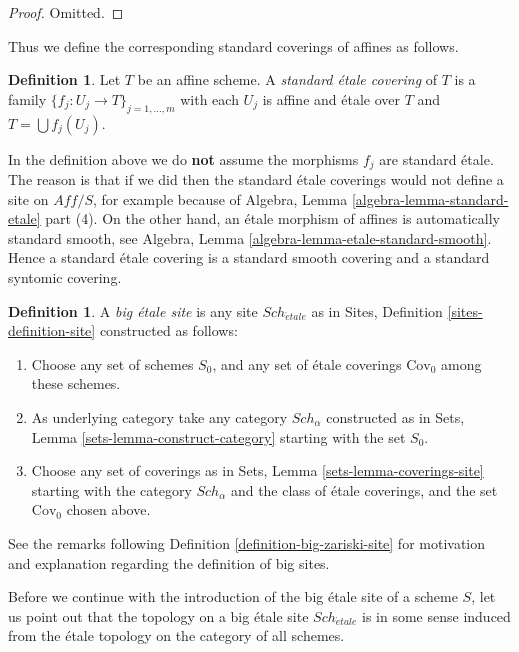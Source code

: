 \documentclass{stacks-project}
\theoremstyle{plain}
\theoremstyle{definition}
\newtheorem{definition}[subsection]{Definition}
\theoremstyle{remark}
\numberwithin{equation}{subsection}
\def\Sch{\mathit{Sch}}
\def\etale{{\acute{e}tale}}
\begin{document}
\begin{proof}
Omitted.
\end{proof}

\noindent
Thus we define the corresponding standard coverings of affines as follows.

\begin{definition}
\label{definition-standard-etale}
Let $T$ be an affine scheme. A {\it standard \'etale covering}
of $T$ is a family $\{f_j : U_j \to T\}_{j = 1, \ldots, m}$
with each $U_j$ is affine and \'etale over $T$ and
$T = \bigcup f_j(U_j)$.
\end{definition}

\noindent
In the definition above we do {\bf not} assume the morphisms $f_j$ are
standard \'etale. The reason is that if we did then the standard \'etale
coverings would not define a site on $\textit{Aff}/S$, for example because of
Algebra, Lemma \ref{algebra-lemma-standard-etale} part (4).
On the other hand, an \'etale morphism of affines is automatically
standard smooth, see
Algebra, Lemma \ref{algebra-lemma-etale-standard-smooth}.
Hence a standard \'etale covering is a standard smooth
covering and a standard syntomic covering.

\begin{definition}
\label{definition-big-etale-site}
A {\it big \'etale site} is any site $\Sch_\etale$ as in
Sites, Definition \ref{sites-definition-site} constructed as follows:
\begin{enumerate}
\item Choose any set of schemes $S_0$, and any set of \'etale coverings
$\text{Cov}_0$ among these schemes.
\item As underlying category take any category $\Sch_\alpha$
constructed as in Sets, Lemma \ref{sets-lemma-construct-category}
starting with the set $S_0$.
\item Choose any set of coverings as in
Sets, Lemma \ref{sets-lemma-coverings-site} starting with the
category $\Sch_\alpha$ and the class of \'etale coverings,
and the set $\text{Cov}_0$ chosen above.
\end{enumerate}
\end{definition}

\noindent
See the remarks following Definition \ref{definition-big-zariski-site}
for motivation and explanation regarding the definition of big sites.

\medskip\noindent
Before we continue with the introduction of the big \'etale site of
a scheme $S$, let us point out that the topology on a big \'etale site
$\Sch_\etale$ is in some sense induced from the \'etale
topology on the category of all schemes.
\end{document}
